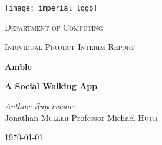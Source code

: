 \begin{titlepage}
    \begin{center}
        \vspace*{2cm}
        \texttt{[image: imperial\_logo]}
        \vspace{2cm}
        
        \LARGE
        \textsc{Department of Computing}
        
        \textsc{Individual Project Interim Report}
        
        \vspace{2cm}
        \vhrulefill{2pt}
        \vspace{0.2cm}
        
        \huge
        \textbf{Amble}
        
        \vspace{0.2cm}
        
        \LARGE
        \textbf{A Social Walking App}
        
        \vspace{0.2cm}
        \vhrulefill{2pt}
        \vspace{2cm}
        
        \begin{flushleft}
            \Large
            \textit{Author:}
            \hfill
            \textit{Supervisor:}\\
            Jonathan \textsc{Muller}
            \hfill
            Professor Michael \textsc{Huth}\\
        \end{flushleft}
        
        \vfill
        \Large
        \today
    \end{center}
\end{titlepage}